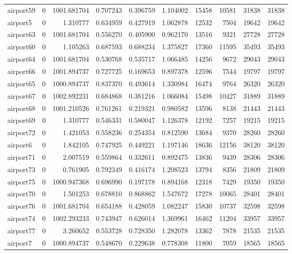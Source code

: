 \begin{longtable}{|l|r|r|r|r|r|r|r|r|r|}
airport59 & 0 & 1001.681704 & 0.707243 & 0.396759 & 1.104002 & 15458 & 10581 & 31838 & 31838 \\
airport5 & 0 & 1.310777 & 0.634959 & 0.427919 & 1.062878 & 12532 & 7504 & 19642 & 19642 \\
airport63 & 0 & 1001.681704 & 0.556270 & 0.405900 & 0.962170 & 13516 & 9321 & 27728 & 27728 \\
airport60 & 0 & 1.105263 & 0.687593 & 0.688234 & 1.375827 & 17360 & 11595 & 35493 & 35493 \\
airport64 & 0 & 1001.681704 & 0.530768 & 0.535717 & 1.066485 & 14256 & 9672 & 29043 & 29043 \\
airport66 & 0 & 1001.894737 & 0.727725 & 0.169653 & 0.897378 & 12596 & 7544 & 19797 & 19797 \\
airport65 & 0 & 1000.894737 & 0.837370 & 0.493614 & 1.330984 & 16474 & 9764 & 26320 & 26320 \\
airport67 & 0 & 1002.892231 & 0.684868 & 0.381216 & 1.066084 & 15498 & 10427 & 31889 & 31889 \\
airport68 & 0 & 1001.210526 & 0.761261 & 0.219321 & 0.980582 & 13596 & 8138 & 21443 & 21443 \\
airport69 & 0 & 1.310777 & 0.546331 & 0.580047 & 1.126378 & 12192 & 7257 & 19215 & 19215 \\
airport72 & 0 & 1.421053 & 0.558236 & 0.254354 & 0.812590 & 13684 & 9370 & 28260 & 28260 \\
airport6 & 0 & 1.842105 & 0.747925 & 0.449221 & 1.197146 & 18636 & 12156 & 38120 & 38120 \\
airport71 & 0 & 2.007519 & 0.559864 & 0.332611 & 0.892475 & 13836 & 9439 & 28306 & 28306 \\
airport73 & 0 & 0.761905 & 0.792349 & 0.416174 & 1.208523 & 13794 & 8356 & 21809 & 21809 \\
airport75 & 0 & 1000.947368 & 0.696990 & 0.197178 & 0.894168 & 12318 & 7429 & 19350 & 19350 \\
airport70 & 0 & 1.501253 & 0.678810 & 0.868862 & 1.547672 & 17278 & 10065 & 28401 & 28401 \\
airport76 & 0 & 1001.681704 & 0.654188 & 0.428059 & 1.082247 & 15830 & 10737 & 32598 & 32598 \\
airport74 & 0 & 1002.293233 & 0.743947 & 0.626014 & 1.369961 & 16462 & 11204 & 33957 & 33957 \\
airport77 & 0 & 3.260652 & 0.553728 & 0.728350 & 1.282078 & 13362 & 7878 & 21535 & 21535 \\
airport7 & 0 & 1000.894737 & 0.548670 & 0.229638 & 0.778308 & 11800 & 7059 & 18565 & 18565 \\

\end{longtable}
